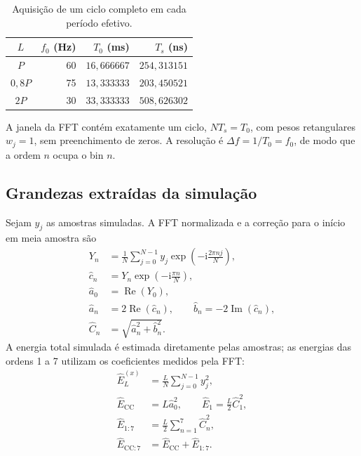 \begin{table}[H]
    \centering\footnotesize
    \setlength{\tabcolsep}{3pt}
    \caption{Aquisição de um ciclo completo em cada período efetivo.}
    \label{tab:aquisicao_fft}
    \begin{tabular}{crrr}\hline
        $L$ & $f_0$ (Hz) & $T_0$ (ms) & $T_s$ (ns) \\\hline
        $P$ & 60 & $16{,}666667$ & $254{,}313151$ \\
        $0{,}8P$ & 75 & $13{,}333333$ & $203{,}450521$ \\
        $2P$ & 30 & $33{,}333333$ & $508{,}626302$ \\\hline
    \end{tabular}
\end{table}

A janela da FFT contém exatamente um ciclo, $NT_s=T_0$, com
pesos retangulares $w_j=1$, sem preenchimento de zeros.
A resolução é $\Delta f=1/T_0=f_0$, de modo que a ordem $n$
ocupa o bin $n$. 

\subsection{Grandezas extraídas da simulação}
Sejam $y_j$ as amostras simuladas. A FFT normalizada e a correção
para o início em meia amostra são
\begin{equation}
    \begin{aligned}
        Y_n&=\frac1N\sum_{j=0}^{N-1}y_j
            \exp\left(-\mathrm{i}\frac{2\pi nj}{N}\right), \\
        \widehat c_n&=Y_n\exp\left(-\mathrm{i}\frac{\pi n}{N}\right), \\
        \widehat a_0&=\operatorname{Re}(Y_0), \\
        \widehat a_n&=2\operatorname{Re}(\widehat c_n), \qquad
        \widehat b_n=-2\operatorname{Im}(\widehat c_n), \\
        \widehat C_n&=\sqrt{\widehat a_n^2+\widehat b_n^2}.
    \end{aligned}
\end{equation}
A energia total simulada é estimada diretamente pelas amostras;
as energias das ordens 1 a 7 utilizam os coeficientes medidos pela FFT:
\begin{equation}
    \begin{aligned}
        \widehat E_L^{(x)}&=\frac LN\sum_{j=0}^{N-1}y_j^2, \\
        \widehat E_{\mathrm{CC}}&=L\widehat a_0^2, \qquad
        \widehat E_1=\frac L2\widehat C_1^2, \\
        \widehat E_{1:7}&=\frac L2\sum_{n=1}^{7}\widehat C_n^2, \\
        \widehat E_{\mathrm{CC}:7}&=\widehat E_{\mathrm{CC}}+\widehat E_{1:7}.
    \end{aligned}
\end{equation}

